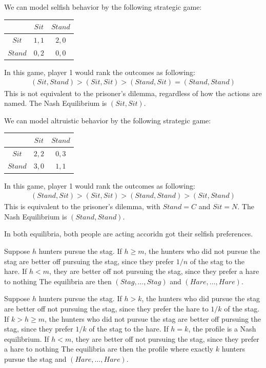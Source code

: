 \documentclass{article}
\begin{document}
\clearpage
\problem{}
We can model selfish behavior by the following strategic game:
\begin{center}
\begin{tabular}{|c|c|c|}
    \hline
     & $Sit$ & $Stand$ \\
     \hline
     $Sit$ & $1, 1$ & $2, 0$ \\
     \hline
     $Stand$ & $0, 2$ & $0, 0$ \\
     \hline
\end{tabular}
\end{center}
In this game, player 1 would rank the outcomes as following:
\begin{align*}
    (Sit, Stand) > (Sit, Sit) > (Stand, Sit) = (Stand, Stand)
\end{align*}
This is not equivalent to the prisoner's dilemma, regardless of how the actions are named. The Nash Equilibrium is $(Sit, Sit)$.

We can model altruistic behavior by the following strategic game:
\begin{center}
\begin{tabular}{|c|c|c|}
    \hline
     & $Sit$ & $Stand$ \\
     \hline
     $Sit$ & $2, 2$ & $0, 3$ \\
     \hline
     $Stand$ & $3, 0$ & $1, 1$ \\
     \hline
\end{tabular}
\end{center}
In this game, player 1 would rank the outcomes as following:
\begin{align*}
    (Stand, Sit) > (Sit, Sit) > (Stand, Stand) > (Sit, Stand)
\end{align*}
This is equivalent to the prisoner's dilemma, with $Stand = C$ and $Sit = N$. The Nash Equilibrium is $(Stand, Stand)$.

In both equilibria, both people are acting accoridn got their selfish preferences.

\clearpage
\problem{}
Suppose $h$ hunters pursue the stag. If $h \geq m$, the hunters who did not pursue the stag are better off pursuing the stag, since they prefer $1/n$ of the stag to the hare. If $h < m$, they are better off not pursuing the stag, since they prefer a hare to nothing The equilibria are then $(Stag, \ldots, Stag)$ and $(Hare, \ldots, Hare)$.

Suppose $h$ hunters pursue the stag. If $h > k$, the hunters who did pursue the stag are better off not pursuing the stag, since they prefer the hare to $1/k$ of the stag. If $k > h \geq m$, the hunters who did not pursue the stag are better off pursuing the stag, since they prefer $1/k$ of the stag to the hare. If $h = k$, the profile is a Nash equilibrium. If $h < m$, they are better off not pursuing the stag, since they prefer a hare to nothing The equilibria are then the profile where exactly $k$ hunters pursue the stag and $(Hare, \ldots, Hare)$.
\end{document}
